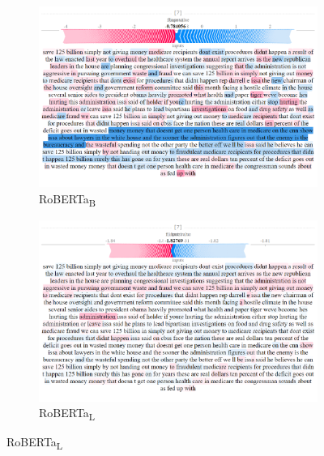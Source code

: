 \begin{figure}[ht]\ContinuedFloat
    \captionsetup[subfigure]{justification=Centering}

    \begin{subfigure}[t]{0.4\textwidth}
        \includegraphics[width=\textwidth]{figs/all_F/roberta-b.png}
        \caption{{RoBERTa}\textsubscript{B}}
    \end{subfigure}
    \hspace{\fill} %
    \begin{subfigure}[t]{0.4\textwidth}
        \includegraphics[width=\linewidth]{figs/all_F/roberta-l.png}
        \caption{{RoBERTa}\textsubscript{L}}
    \end{subfigure}




\end{figure}
